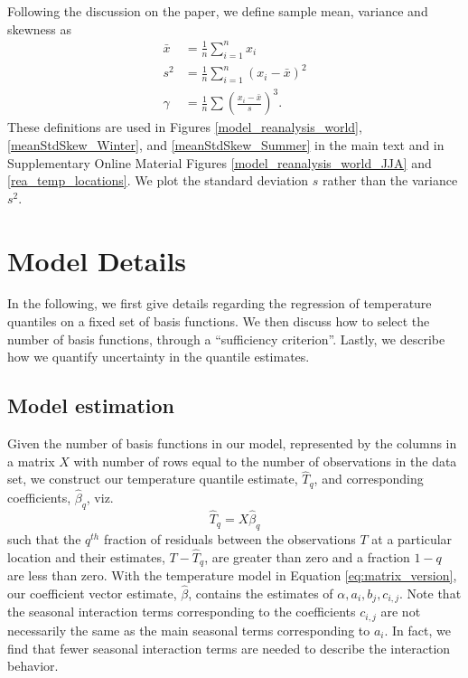 \documentclass{ametsoc}
\begin{document}
Following the discussion on the paper, we define sample mean, variance and skewness as
\begin{align}
\bar{x} &= \frac{1}{n}\sum_{i=1}^n x_i \nonumber\\ 
s^2 &= \frac{1}{n}\sum_{i=1}^n \left(x_i - \bar{x}\right)^2 \nonumber\\ 
\gamma &= \frac{1}{n}\sum \left(\frac{x_i - \bar{x}}{s}\right)^3.
\end{align}
These definitions are used in Figures \ref{model_reanalysis_world}, \ref{meanStdSkew_Winter}, and \ref{meanStdSkew_Summer} in the main text  
and in Supplementary Online Material Figures \ref{model_reanalysis_world_JJA} and \ref{rea_temp_locations}. We plot the standard deviation ${s}$ rather than the variance $s^2$. %



\section{Model Details}
\label{app:model}

In the following, we first give details regarding the regression of temperature quantiles on a fixed set of basis functions. We then discuss how to select the number of basis functions, through a ``sufficiency criterion''. Lastly, we describe how we quantify uncertainty in the quantile estimates.

 \subsection{Model estimation}
 Given the number of basis functions in our model, represented by the columns in a matrix $X$ with number of rows equal to the number of observations in the data set,  we construct our temperature quantile estimate, $\hat{T}_q$, and corresponding coefficients, $\hat{\beta}_q$, viz.
 \begin{equation}
 \hat{T}_q = X\hat{\beta}_q
 \end{equation}
such that the $q^{th}$ fraction of residuals between the observations $T$ at a particular location and their estimates, $T - \hat{T}_q$, are greater than zero and a fraction $1-q$ are less than zero. With the temperature model in Equation \ref{eq:matrix_version}, our coefficient vector estimate, $\hat{\beta}$, contains the estimates of $\alpha,a_i, b_j, c_{i,j}$. Note that the seasonal interaction terms corresponding to the coefficients $c_{i,j}$ are not necessarily the same as the main seasonal terms corresponding to $a_i$. In fact, we find that fewer seasonal interaction terms are needed to describe the interaction behavior. 
\end{document}
